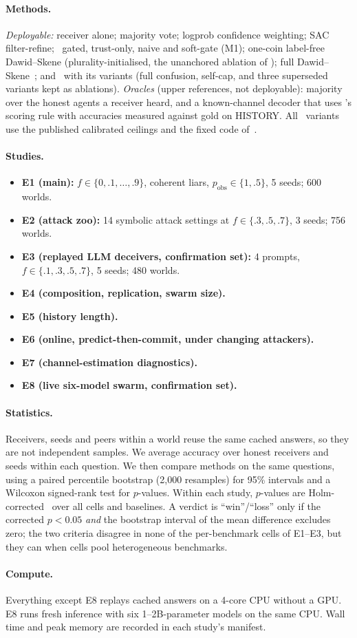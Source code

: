 \paragraph{Methods.} \emph{Deployable:} receiver alone; majority vote; logprob confidence weighting; SAC filter-refine; \aip\ gated, trust-only, naive and soft-gate (M1); one-coin label-free Dawid--Skene (plurality-initialised, the unanchored ablation of \race); full Dawid--Skene~\citep{dawid1979}; and \race\ with its variants (full confusion, self-cap, and three superseded variants kept as ablations). \emph{Oracles} (upper references, not deployable): majority over the honest agents a receiver heard, and a known-channel decoder that uses \race's scoring rule with accuracies measured against gold on HISTORY. All \aip\ variants use the published calibrated ceilings and the fixed code of~\citep{nabidnur2026bucket}.

\paragraph{Studies.}
\begin{itemize}
\item \textbf{E1 (main):} $f\in\{0,.1,\dots,.9\}$, coherent liars, $p_{\text{obs}}\in\{1,.5\}$, 5 seeds; 600 worlds.
\item \textbf{E2 (attack zoo):} 14 symbolic attack settings at $f\in\{.3,.5,.7\}$, 3 seeds; 756 worlds.
\item \textbf{E3 (replayed LLM deceivers, confirmation set):} 4 prompts, $f\in\{.1,.3,.5,.7\}$, 5 seeds; 480 worlds.
\item \textbf{E4 (composition, replication, swarm size).}
\item \textbf{E5 (history length).}
\item \textbf{E6 (online, predict-then-commit, under changing attackers).}
\item \textbf{E7 (channel-estimation diagnostics).}
\item \textbf{E8 (live six-model swarm, confirmation set).}
\end{itemize}

\paragraph{Statistics.} Receivers, seeds and peers within a world reuse the same cached answers, so they are not independent samples. We average accuracy over honest receivers and seeds within each question. We then compare methods on the same questions, using a paired percentile bootstrap (2{,}000 resamples) for 95\% intervals and a Wilcoxon signed-rank test for $p$-values. Within each study, $p$-values are Holm-corrected~\citep{holm1979} over all cells and baselines. A verdict is ``win''/``loss'' only if the corrected $p<0.05$ \emph{and} the bootstrap interval of the mean difference excludes zero; the two criteria disagree in none of the per-benchmark cells of E1--E3, but they can when cells pool heterogeneous benchmarks.

\paragraph{Compute.} Everything except E8 replays cached answers on a 4-core CPU without a GPU. E8 runs fresh inference with six 1--2B-parameter models on the same CPU. Wall time and peak memory are recorded in each study's manifest.
